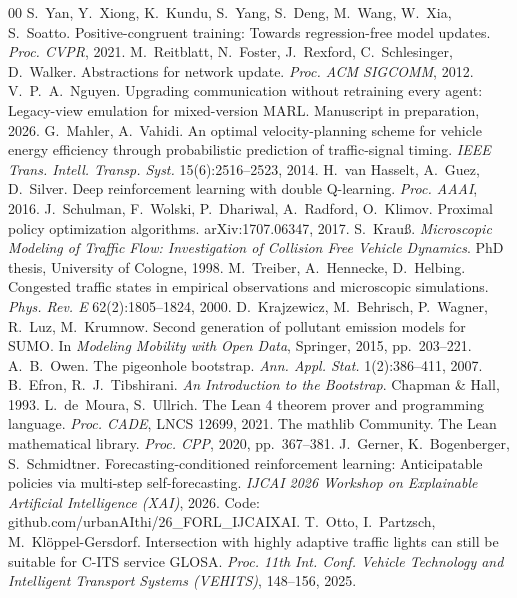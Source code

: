 \begin{thebibliography}{00}
 S.~Yan, Y.~Xiong, K.~Kundu, S.~Yang, S.~Deng, M.~Wang, W.~Xia, S.~Soatto. Positive-congruent training: Towards regression-free model updates. \emph{Proc. CVPR}, 2021.
 M.~Reitblatt, N.~Foster, J.~Rexford, C.~Schlesinger, D.~Walker. Abstractions for network update. \emph{Proc. ACM SIGCOMM}, 2012.
 V.~P.~A.~Nguyen. Upgrading communication without retraining every agent: Legacy-view emulation for mixed-version MARL. Manuscript in preparation, 2026.
 G.~Mahler, A.~Vahidi. An optimal velocity-planning scheme for vehicle energy efficiency through probabilistic prediction of traffic-signal timing. \emph{IEEE Trans. Intell. Transp. Syst.} 15(6):2516--2523, 2014.
 H.~van Hasselt, A.~Guez, D.~Silver. Deep reinforcement learning with double Q-learning. \emph{Proc. AAAI}, 2016.
 J.~Schulman, F.~Wolski, P.~Dhariwal, A.~Radford, O.~Klimov. Proximal policy optimization algorithms. arXiv:1707.06347, 2017.
 S.~Krau{\ss}. \emph{Microscopic Modeling of Traffic Flow: Investigation of Collision Free Vehicle Dynamics}. PhD thesis, University of Cologne, 1998.
 M.~Treiber, A.~Hennecke, D.~Helbing. Congested traffic states in empirical observations and microscopic simulations. \emph{Phys. Rev. E} 62(2):1805--1824, 2000.
 D.~Krajzewicz, M.~Behrisch, P.~Wagner, R.~Luz, M.~Krumnow. Second generation of pollutant emission models for SUMO. In \emph{Modeling Mobility with Open Data}, Springer, 2015, pp.~203--221.
 A.~B.~Owen. The pigeonhole bootstrap. \emph{Ann. Appl. Stat.} 1(2):386--411, 2007.
 B.~Efron, R.~J.~Tibshirani. \emph{An Introduction to the Bootstrap}. Chapman \& Hall, 1993.
 L.~de~Moura, S.~Ullrich. The Lean 4 theorem prover and programming language. \emph{Proc. CADE}, LNCS 12699, 2021.
 The mathlib Community. The Lean mathematical library. \emph{Proc. CPP}, 2020, pp.~367--381.
 J.~Gerner, K.~Bogenberger, S.~Schmidtner. Forecasting-conditioned reinforcement learning: Anticipatable policies via multi-step self-forecasting. \emph{IJCAI 2026 Workshop on Explainable Artificial Intelligence (XAI)}, 2026. Code: github.com/urbanAIthi/26\_FORL\_IJCAIXAI.
 T.~Otto, I.~Partzsch, M.~Kl\"oppel-Gersdorf. Intersection with highly adaptive traffic lights can still be suitable for C-ITS service GLOSA. \emph{Proc. 11th Int. Conf. Vehicle Technology and Intelligent Transport Systems (VEHITS)}, 148--156, 2025.

\end{thebibliography}
